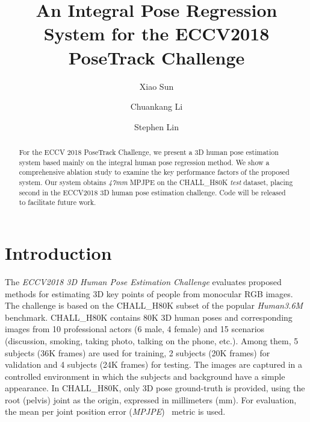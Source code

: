 \documentclass[runningheads]{llncs}
\begin{document}
\pagestyle{headings}
\mainmatter
\def\ECCV18SubNumber{}  

\title{An Integral Pose Regression System for the ECCV2018 PoseTrack Challenge} 





\author{Xiao Sun \and
Chuankang Li \and
Stephen Lin}



\maketitle

\begin{abstract} For the ECCV 2018 PoseTrack Challenge, we present a 3D human pose estimation system based mainly on the integral human pose regression method. We show a comprehensive ablation study to examine the key performance factors of the proposed system. Our system obtains \emph{47mm} MPJPE on the CHALL\_H80K \emph{test} dataset, placing second in the ECCV2018 3D human pose estimation challenge. Code will be released to facilitate future work.

\end{abstract}






\section{Introduction}
\label{sec.introduction}

The \emph{ECCV2018 3D Human Pose Estimation Challenge} evaluates proposed methods for estimating 3D key points of people from monocular RGB images. The challenge is based on the CHALL\_H80K subset of the popular \emph{Human3.6M~\cite{ionescu2011latent,ionescu2014human3}} benchmark. CHALL\_H80K contains 80K 3D human poses and corresponding images from 10 professional actors (6 male, 4 female) and 15 scenarios (discussion, smoking, taking photo, talking on the phone, etc.). Among them, 5 subjects (36K frames) are used for training, 2 subjects (20K frames) for validation and 4 subjects (24K frames) for testing. The images are captured in a controlled environment in which the subjects and background have a simple appearance. In CHALL\_H80K, only 3D pose ground-truth is provided, using the root (pelvis) joint as the origin, expressed in millimeters (mm). For evaluation, the mean per joint position error (\emph{MPJPE})~\cite{ionescu2014human3} metric is used.
\end{document}

